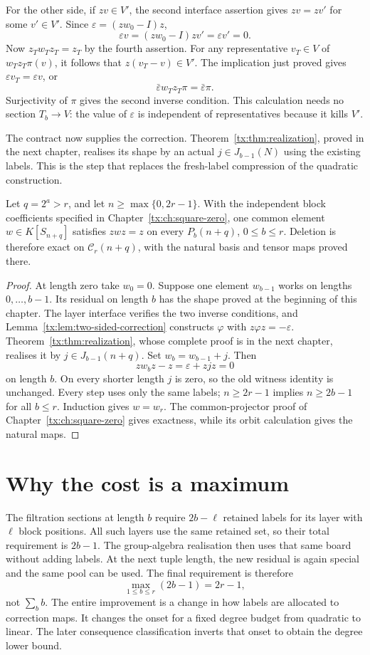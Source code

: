 For the other side, if $zv\in V'$, the second interface assertion gives $zv=zv'$ for some $v'\in V'$. Since $\varepsilon=(zw_0-I)z$,
\[
       \varepsilon v=(zw_0-I)zv'=\varepsilon v'=0.
\]
Now $z_Tw_Tz_T=z_T$ by the fourth assertion. For any representative $v_T\in V$ of $w_Tz_T\pi(v)$, it follows that $z(v_T-v)\in V'$. The implication just proved gives $\varepsilon v_T=\varepsilon v$, or
\[
               \bar\varepsilon w_Tz_T\pi=\bar\varepsilon\pi.
\]
Surjectivity of $\pi$ gives the second inverse condition. This calculation needs no section $T_b\to V$: the value of $\varepsilon$ is independent of representatives because it kills $V'$.

The contract now supplies the correction. Theorem~\ref{tx:thm:realization}, proved in the next chapter, realises its shape by an actual $j\in J_{b-1}(N)$ using the existing labels. This is the step that replaces the fresh-label compression of the quadratic construction.

\begin{theorem}\label{tx:thm:witness2}
Let $q=2^a>r$, and let $n\ge\max\{0,2r-1\}$. With the independent
block coefficients specified in Chapter~\ref{tx:ch:square-zero}, one
common element $w\in K[S_{n+q}]$ satisfies $zwz=z$ on every
$P_b(n+q)$, $0\le b\le r$. Deletion is therefore exact on
$\mathcal C_r(n+q)$, with the natural basis and tensor maps proved
there.
\end{theorem}
\begin{proof}
At length zero take $w_0=0$. Suppose one element $w_{b-1}$ works
on lengths $0,\ldots,b-1$. Its residual on length $b$ has the
shape proved at the beginning of this chapter. The layer interface
verifies the two inverse conditions, and Lemma~\ref{tx:lem:two-sided-correction}
constructs $\varphi$ with $z\varphi z=-\varepsilon$. Theorem~\ref{tx:thm:realization}, whose
complete proof is in the next chapter, realises it by
$j\in J_{b-1}(n+q)$. Set $w_b=w_{b-1}+j$. Then
\[
 z w_b z-z=\varepsilon+zjz=0
\]
on length $b$. On every shorter length $j$ is zero, so the old
witness identity is unchanged. Every step uses only the same labels;
$n\ge2r-1$ implies $n\ge2b-1$ for all $b\le r$. Induction gives
$w=w_r$. The common-projector proof of Chapter~\ref{tx:ch:square-zero} gives
exactness, while its orbit calculation gives the natural maps.
\end{proof}

\section*{Why the cost is a maximum}
The filtration sections at length $b$ require $2b-\ell$ retained labels
for its layer with $\ell$ block positions. All such layers use the same
retained set, so their total requirement is $2b-1$. The group-algebra
realisation then uses that same board without adding labels. At the
next tuple length, the new residual is again special and the same
pool can be used. The final requirement is therefore
\[
                 \max_{1\le b\le r}(2b-1)=2r-1,
\]
not $\sum_b b$. The entire improvement is a change in how labels
are allocated to correction maps. It changes the onset for a fixed
degree budget from quadratic to linear. The later consequence
classification inverts that onset to obtain the degree lower bound.

